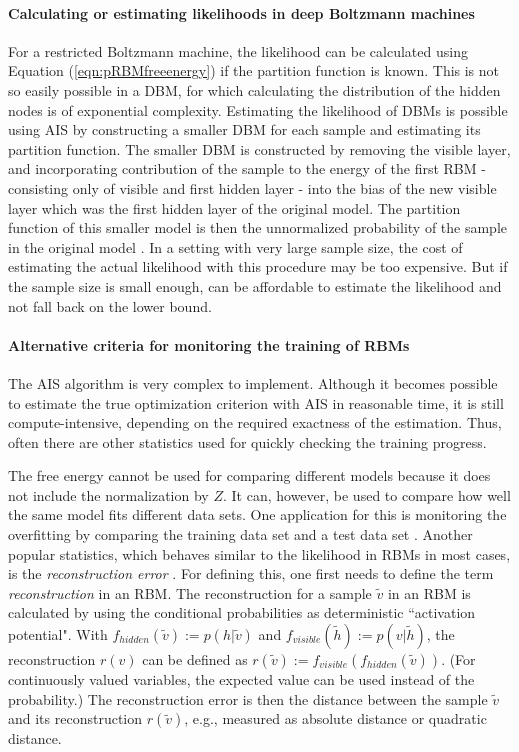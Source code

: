 \documentclass[12pt]{article}
\begin{document}
\paragraph{Calculating or estimating likelihoods in deep Boltzmann machines}
For a restricted Boltzmann machine, the likelihood can be calculated using Equation (\ref{eqn:pRBMfreeenergy}) if the partition function is known. This is not so easily possible in a DBM, for which calculating the distribution of the hidden nodes is of exponential complexity.
Estimating the likelihood of DBMs is possible using AIS by constructing a smaller DBM for each sample and estimating its partition function.
The smaller DBM is constructed by removing the visible layer, and incorporating contribution of the sample to the energy of the first RBM - consisting only of visible and first hidden layer - into the bias of the new visible layer which was the first hidden layer of the original model.
The partition function of this smaller model is then the unnormalized probability of the sample in the original model \citep{salakhutdinov2009DBMs}.
In a setting with very large sample size, the cost of estimating the actual likelihood with this procedure may be too expensive. But if the sample size is small enough, can be affordable to estimate the likelihood and not fall back on the lower bound.

\paragraph{Alternative criteria for monitoring the training of RBMs}
The AIS algorithm is very complex to implement.
Although it becomes possible to estimate the true optimization criterion with AIS in reasonable time, it is still compute-intensive, depending on the required exactness of the estimation.
Thus, often there are other statistics used for quickly checking the training progress.

The free energy cannot be used for comparing different models because it does not include the normalization by $Z$.
It can, however, be used to compare how well the same model fits different data sets.
One application for this is monitoring the overfitting by comparing the training data set and a test data set \citep{hinton_practical_2012}.
\label{reconstructionerror}
Another popular statistics, which behaves similar to the likelihood in RBMs in most cases, is the {\em reconstruction error} \citep{hinton_practical_2012}.
For defining this, one first needs to define the term {\em reconstruction} in an RBM.
The reconstruction \citep{hinton_practical_2012} for a sample $\tilde{v}$ in an RBM is calculated by using the conditional probabilities as deterministic ``activation potential".
With $f_{hidden}(\tilde{v}) := p(h|\tilde{v})$ and $f_{visible}(\tilde{h}) :=  p(v|\tilde{h})$, the reconstruction $r(v)$ can be defined as $r(\tilde{v}) := f_{visible}(f_{hidden}(\tilde{v}))$.
(For continuously valued variables, the expected value can be used instead of the probability.)
The reconstruction error is then the distance between the sample $\tilde{v}$ and its reconstruction $r(\tilde{v})$, e.g., measured as absolute distance or quadratic distance.
\end{document}
